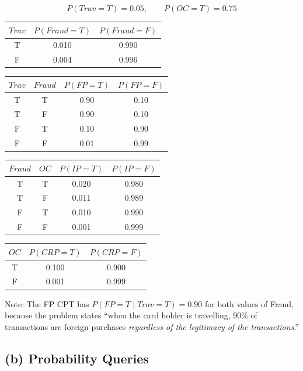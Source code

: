 \documentclass[12pt]{article}
\begin{document}
\[
P(\textit{Trav}{=}T)=0.05,\qquad P(\textit{OC}{=}T)=0.75
\]

\begin{center}
\begin{tabular}{ccc}
\toprule
$\textit{Trav}$ & $P(\textit{Fraud}{=}T)$ & $P(\textit{Fraud}{=}F)$\\
\midrule
T & 0.010 & 0.990\\
F & 0.004 & 0.996\\
\bottomrule
\end{tabular}
\end{center}

\begin{center}
\begin{tabular}{cccc}
\toprule
$\textit{Trav}$ & $\textit{Fraud}$ & $P(\textit{FP}{=}T)$ & $P(\textit{FP}{=}F)$\\
\midrule
T & T & 0.90 & 0.10\\
T & F & 0.90 & 0.10\\
F & T & 0.10 & 0.90\\
F & F & 0.01 & 0.99\\
\bottomrule
\end{tabular}
\quad
\begin{tabular}{cccc}
\toprule
$\textit{Fraud}$ & $\textit{OC}$ & $P(\textit{IP}{=}T)$ & $P(\textit{IP}{=}F)$\\
\midrule
T & T & 0.020 & 0.980\\
T & F & 0.011 & 0.989\\
F & T & 0.010 & 0.990\\
F & F & 0.001 & 0.999\\
\bottomrule
\end{tabular}
\quad
\begin{tabular}{ccc}
\toprule
$\textit{OC}$ & $P(\textit{CRP}{=}T)$ & $P(\textit{CRP}{=}F)$\\
\midrule
T & 0.100 & 0.900\\
F & 0.001 & 0.999\\
\bottomrule
\end{tabular}
\end{center}

Note: The FP CPT has $P(\textit{FP}{=}T\mid\textit{Trav}{=}T)=0.90$ for both values of Fraud,
because the problem states ``when the card holder is travelling, 90\% of transactions are
foreign purchases \emph{regardless of the legitimacy of the transactions}.''

\subsection*{(b) Probability Queries}
\end{document}
